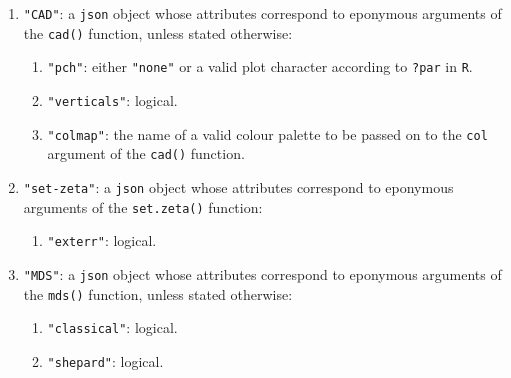 \begin{refsection}
\begin{enumerate}[leftmargin=\parindent,align=left,
      labelwidth=\parindent,label*=2.\arabic*.]
\begin{enumerate}[leftmargin=\parindent,align=left,
      labelwidth=\parindent,label*=\arabic*.]
    \item{\tt "maxx"}: either \texttt{"auto"} or a number to be passed
      on to the \texttt{to} argument of the \texttt{kde()} function.
    \item{\tt "bandwidth"}: either \texttt{"auto"} or a number to be
      passed on to the \texttt{bw} argument of the \texttt{kde()}
      function.
    \item{\tt "rugdetritals"}: logical.  To be passed on to the
      \texttt{rug} argument of the \texttt{kde()} function if
      \texttt{"geochronometer"} is \texttt{"detritals"}.
    \item{\tt "rug"}: logical. To be passed on to the \texttt{rug}
      argument of the \texttt{kde()} function if
      \texttt{"geochronometer"} is NOT \texttt{"detritals"}.
  \end{enumerate}  
\item{\tt "CAD"}: a \texttt{json} object whose attributes correspond
  to eponymous arguments of the \texttt{cad()} function, unless stated
  otherwise:
  \begin{enumerate}[leftmargin=\parindent,align=left,
      labelwidth=\parindent,label*=\arabic*.]
  \item{\tt "pch"}: either \texttt{"none"} or a valid plot character
    according to \texttt{?par} in \texttt{R}.
  \item{\tt "verticals"}: logical.
  \item{\tt "colmap"}: the name of a valid colour palette to be passed
    on to the \texttt{col} argument of the \texttt{cad()} function.
  \end{enumerate}  
\item{\tt "set-zeta"}: a \texttt{json} object whose attributes
  correspond to eponymous arguments of the \texttt{set.zeta()}
  function:
  \begin{enumerate}[leftmargin=\parindent,align=left,
      labelwidth=\parindent,label*=\arabic*.]
    \item{\tt "exterr"}: logical.
  \end{enumerate}  
\item{\tt "MDS"}: a \texttt{json} object whose attributes correspond
  to eponymous arguments of the \texttt{mds()} function, unless stated
  otherwise:
  \begin{enumerate}[leftmargin=\parindent,align=left,
      labelwidth=\parindent,label*=\arabic*.]
    \item{\tt "classical"}: logical.
    \item{\tt "shepard"}: logical.

\end{enumerate}
\end{enumerate}
\end{refsection}
